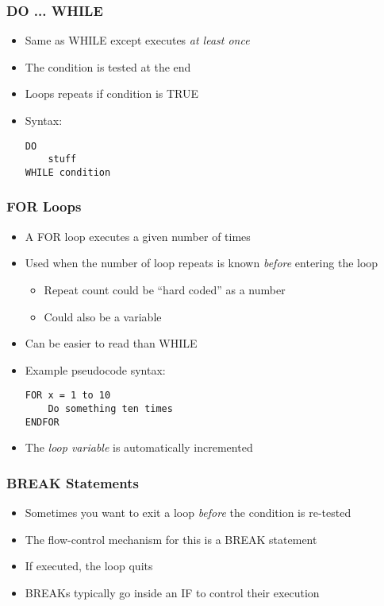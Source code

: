 \documentclass[14pt]{beamer}
\begin{document}
\begin{frame}[fragile]
\frametitle{DO ... WHILE}
\begin{itemize}
\item Same as WHILE except executes \textit{at least once}
\item The condition is tested at the end
\item Loops repeats if condition is TRUE
\item Syntax:
\begin{lstlisting}[style=pseudo]
DO
	stuff
WHILE condition
\end{lstlisting}
\end{itemize}

\end{frame}

\begin{frame}[fragile]
\frametitle{FOR Loops}
\begin{itemize}
\item A FOR loop executes a given number of times
\item Used when the number of loop repeats is known \textit{before} entering the loop
	\begin{itemize}
		\item Repeat count could be ``hard coded'' as a number
		\item Could also be a variable
	\end{itemize}
\item Can be easier to read than WHILE
\item Example pseudocode syntax:
\begin{lstlisting}[style=pseudo]
FOR x = 1 to 10
	Do something ten times
ENDFOR
\end{lstlisting}
\item The \textit{loop variable} is automatically incremented
\end{itemize}
\end{frame}

\begin{frame}
\frametitle{BREAK Statements}
\begin{itemize}
\item Sometimes you want to exit a loop \textit{before} the condition is re-tested
\item The flow-control mechanism for this is a BREAK statement
\item If executed, the loop quits
\item BREAKs typically go inside an IF to control their execution
\end{itemize}
\end{frame}
\end{document}
